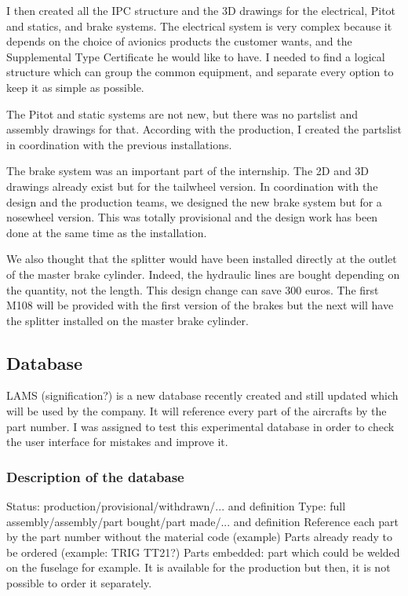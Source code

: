 \documentclass[11pt,a4paper]{report}
\begin{document}
I then created all the IPC structure and the 3D drawings for the electrical, Pitot and statics, and brake systems.
The electrical system is very complex because it depends on the choice of avionics products the customer wants, and the Supplemental Type Certificate he would like to have. I needed to find a logical structure which can group the common equipment, and separate every option to keep it as simple as possible.

\bigskip

The Pitot and static systems are not new, but there was no partslist and assembly drawings for that. According with the production, I created the partslist in coordination with the previous installations.

The brake system was an important part of the internship. The 2D and 3D drawings already exist but for the tailwheel version.
In coordination with the design and the production teams, we designed the new brake system but for a nosewheel version. This was totally provisional and the design work has been done at the same time as the installation.

We also thought that the splitter would have been installed directly at the outlet of the master brake cylinder. Indeed, the hydraulic lines are bought depending on the quantity, not the length. This design change can save 300 euros.
The first M108 will be provided with the first version of the brakes but the next will have the splitter installed on the master brake cylinder.

\subsection{Database}
LAMS (signification?) is a new database recently created and still updated which will be used by the company. It will reference every part of the aircrafts by the part number.
I was assigned to test this experimental database in order to check the user interface for mistakes and improve it.

\subsubsection{Description of the database}
Status: production/provisional/withdrawn/... and definition
Type: full assembly/assembly/part bought/part made/... and definition
Reference each part by the part number without the material code (example)
Parts already ready to be ordered (example: TRIG TT21?)
Parts embedded: part which could be welded on the fuselage for example. It is available for the production but then, it is not possible to order it separately.
\end{document}
